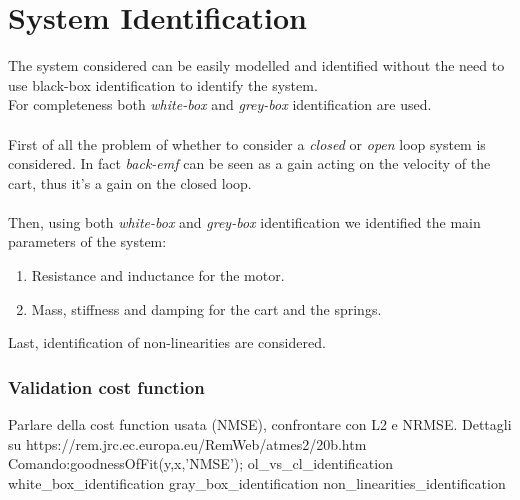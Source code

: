 \chapter{System Identification}
The system considered can be easily modelled and identified without the need to use black-box identification to identify the system. \\ For completeness both \emph{white-box} and \emph{grey-box} identification are used.\\ \\
First of all the problem of whether to consider a \emph{closed} or \emph{open} loop system is considered. In fact \emph{back-emf} can be seen as a gain acting on the velocity of the cart, thus it's a gain on the closed loop.\\ \\
Then, using both \emph{white-box} and \emph{grey-box} identification we identified the main parameters of the system: 
\begin{enumerate}
\item Resistance and inductance for the motor.
\item Mass, stiffness and damping for the cart and the springs.
\end{enumerate}
Last, identification of non-linearities are considered.
\subsection{Validation cost function}

Parlare della cost function usata (NMSE), confrontare con L2 e NRMSE.
Dettagli su  https://rem.jrc.ec.europa.eu/RemWeb/atmes2/20b.htm
Comando:goodnessOfFit(y,x,'NMSE');
{ol_vs_cl_identification}
\newpage
{white_box_identification}
\newpage
{gray_box_identification}
\newpage
{non_linearities_identification}